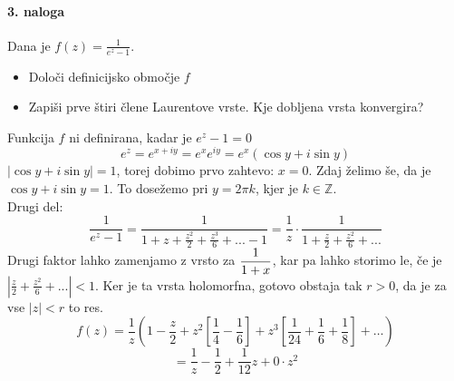 \documentclass[a4paper]{article}
\newcommand{\Z}{\mathbb{Z}}
\begin{document}
\paragraph{3. naloga} Dana je $f(z) = \displaystyle{\frac{1}{e^z-1}}$.
\begin{itemize}
    \item Določi definicijsko območje $f$
    \item Zapiši prve štiri člene Laurentove vrste. Kje dobljena vrsta konvergira?
\end{itemize}
Funkcija $f$ ni definirana, kadar je $e^z-1=0$
$$e^z = e^{x+iy} = e^xe^{iy} = e^x(\cos y + i\sin y)$$
$|\cos y + i\sin y| = 1$, torej dobimo prvo zahtevo: $x=0$.
Zdaj želimo še, da je $\cos y + i\sin y = 1$. To dosežemo pri $y = 2\pi k$, kjer je $k\in\Z$. \\
Drugi del:
$$\frac{1}{e^z-1}=\frac{1}{1 + z + \frac{z^2}{2} + \frac{z^3}{6} + ... - 1} = \frac{1}{z}\cdot\frac{1}{1 + \frac{z}{2} + \frac{z^2}{6} + ...}$$
Drugi faktor lahko zamenjamo z vrsto za $\displaystyle{{1}\over{1+x}}$, kar pa lahko storimo le, če je $\displaystyle{\left|\frac{z}{2} + \frac{z^2}{6} + ...\right|<1}$.
Ker je ta vrsta holomorfna, gotovo obstaja tak $r>0$, da je za vse $|z|<r$ to res.
$$f(z) = \frac{1}{z}\left(1 - \frac{z}{2} + z^2\left[\frac{1}{4}-\frac{1}{6}\right] + z^3\left[\frac{1}{24} + \frac{1}{6} + \frac{1}{8}\right] + \dots\right)$$
$$= \frac{1}{z} - \frac{1}{2} + \frac{1}{12}z + 0\cdot z^2$$
\end{document}
